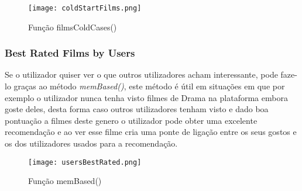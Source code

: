 \begin{figure}[H]
\centering
\texttt{[image: coldStartFilms.png]}
\caption {Função filmsColdCases()}
\label {fig05}
\end{figure}

\subsubsection{Best Rated Films by Users}

\par Se o utilizador quiser ver o que outros utilizadores acham interessante, pode faze-lo graças ao método \textit{memBased()}, este método é útil em situações em que por exemplo o utilizador nunca tenha visto filmes de Drama na plataforma embora goste deles, desta forma caso outros utilizadores tenham visto e dado boa pontuação a filmes deste genero o utilizador pode obter uma excelente recomendação e ao ver esse filme cria uma ponte de ligação entre os seus gostos e os dos utilizadores usados para a recomendação.

\begin{figure}[H]
\centering
\texttt{[image: usersBestRated.png]}
\caption {Função memBased()}
\label {fig06}
\end{figure}


\newpage

